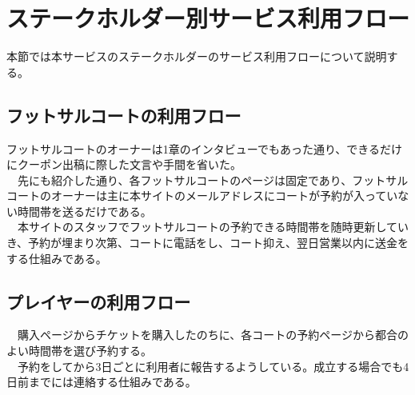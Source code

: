 \section{ステークホルダー別サービス利用フロー}
本節では本サービスのステークホルダーのサービス利用フローについて説明する。

\subsection{フットサルコートの利用フロー}
フットサルコートのオーナーは1章のインタビューでもあった通り、できるだけにクーポン出稿に際した文言や手間を省いた。
\\　先にも紹介した通り、各フットサルコートのページは固定であり、フットサルコートのオーナーは主に本サイトのメールアドレスにコートが予約が入っていない時間帯を送るだけである。
\\　本サイトのスタッフでフットサルコートの予約できる時間帯を随時更新していき、予約が埋まり次第、コートに電話をし、コート抑え、翌日営業以内に送金をする仕組みである。


\subsection{プレイヤーの利用フロー}
　購入ページからチケットを購入したのちに、各コートの予約ページから都合のよい時間帯を選び予約する。
　\\　予約をしてから3日ごとに利用者に報告するようしている。成立する場合でも4日前までには連絡する仕組みである。